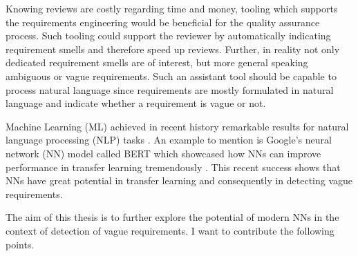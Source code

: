Knowing reviews are costly regarding time and money, tooling which supports the requirements engineering would be beneficial for the quality assurance process.
Such tooling could support the reviewer by automatically indicating requirement smells and therefore speed up reviews.
Further, in reality not only dedicated requirement smells are of interest, but more general speaking ambiguous or vague requirements.
Such an assistant tool should be capable to process natural language since requirements are mostly formulated in natural language \parencite{Mich:2004} and indicate whether a requirement is vague or not.

Machine Learning (ML) achieved in recent history remarkable results for natural language processing (NLP) tasks \parencite{Khan:2016}.
An example to mention is Google's neural network (NN) model called BERT which showcased how NNs can improve performance in transfer learning tremendously \parencite{Devlin:2018}.
This recent success shows that NNs have great potential in transfer learning and consequently in detecting vague requirements.

The aim of this thesis is to further explore the potential of modern NNs in the context of detection of vague requirements.
I want to contribute the following points.
